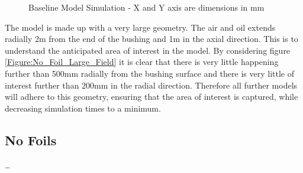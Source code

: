 \begin{figure}[!htb]
{	\label{Figure:No_Foil_Large_Mesh}
  }
\caption{Baseline Model Simulation - X and Y axis are dimensions in mm}
  \label{Figure:No_Foil_Large}
\end{figure}

The model is made up with a very large geometry. 
The air and oil extends radially 2m from the end of the bushing and 1m in the axial direction.
This is to understand the anticipated area of interest in the model.
By considering figure \ref{Figure:No_Foil_Large_Field} it is clear that there is very little happening further than 500mm radially from the bushing surface and there is very little of interest further than 200mm in the radial direction.
Therefore all further models will adhere to this geometry, ensuring that the area of interest is captured, while decreasing simulation times to a minimum.

\subsection{No Foils}
\dots


